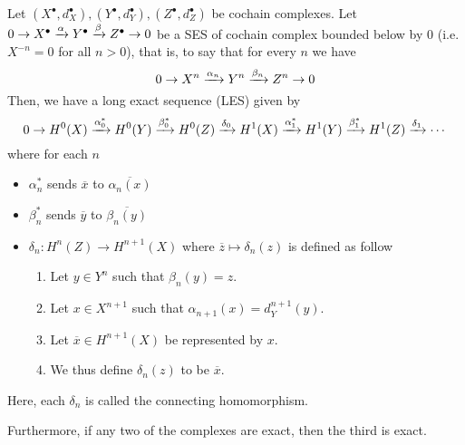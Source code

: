 \begin{thm} 
    Let $(X^\bullet, d_X^\bullet), (Y^\bullet, d_Y^\bullet), (Z^\bullet, d_Z^\bullet)$ be cochain complexes. Let $0\to X^\bullet \xrightarrow{\alpha} Y^\bullet \xrightarrow{\beta} Z^\bullet \to 0$ be a SES of cochain complex bounded below by $0$ (i.e. $X^{-n} = 0$ for all $n> 0$), that is, to say that for every $n$ we have
    \[0 \to X^n \xrightarrow{\alpha_n} Y^n \xrightarrow{\beta_n} Z^n \to 0\]
    Then, we have a long exact sequence (LES) given by
    \[0 \to H^0(X) \xrightarrow{\alpha^*_0} H^0(Y) \xrightarrow{\beta^*_0} H^0(Z) \xrightarrow{\delta_0} H^1(X) \xrightarrow{\alpha^*_1} H^1(Y) \xrightarrow{\beta^*_1} H^1(Z) \xrightarrow{\delta_1} \cdots\]
    where for each $n$ 
    \begin{itemize}
        \item $\alpha^*_n$ sends $\overline {x}$ to $\overline{\alpha_{n}(x)}$
        \item $\beta^*_n$ sends $\overline{y}$ to $\overline{\beta_{n}(y)}$
        \item $\delta_n:H^n(Z)\to H^{n+1}(X)$ where $\overline z \mapsto \delta_n(z)$ is defined as follow
        \begin{enumerate}
            \item Let $y\in Y^n$ such that $\beta_n(y)=z$.
            \item Let $x\in X^{n+1}$ such that $\alpha_{n+1}(x) = d_Y^{n+1}(y)$.
            \item Let $\overline x \in H^{n+1}(X)$ be represented by $x$.
            \item We thus define $\delta_n(z)$ to be $\overline x$.
        \end{enumerate}
    \end{itemize}
    Here, each $\delta_n$ is called the connecting homomorphism.

    Furthermore, if any two of the complexes are exact, then the third is exact.
\end{thm}
